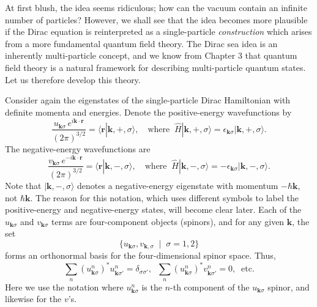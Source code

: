\documentclass[pra,12pt]{revtex4}
\begin{document}
At first blush, the idea seems ridiculous; how can the vacuum contain
an infinite number of particles?  However, we shall see that the idea
becomes more plausible if the Dirac equation is reinterpreted as a
single-particle \textit{construction} which arises from a more
fundamental quantum field theory.  The Dirac sea idea is an inherently
multi-particle concept, and we know from Chapter 3 that quantum field
theory is a natural framework for describing multi-particle quantum
states.  Let us therefore develop this theory.

Consider again the eigenstates of the single-particle Dirac
Hamiltonian with definite momenta and energies.  Denote the
positive-energy wavefunctions by
\begin{equation}
  \frac{u_{\mathbf{k}\sigma} \, e^{i\mathbf{k}\cdot \mathbf{r}}}{(2\pi)^{3/2}}
  = \langle \mathbf{r} | \mathbf{k}, +, \sigma\rangle,
  \quad\mathrm{where}\;\;
  \hat{H} |\mathbf{k}, +, \sigma\rangle
  = \epsilon_{\mathbf{k}\sigma} |\mathbf{k}, +, \sigma\rangle.
  \label{Diraces1}
\end{equation}
The negative-energy wavefunctions are
\begin{equation}
  \frac{v_{\mathbf{k}\sigma} \, e^{-i\mathbf{k}\cdot \mathbf{r}}}{(2\pi)^{3/2}}
  = \langle \mathbf{r} | \mathbf{k}, -, \sigma\rangle,
  \quad\mathrm{where}\;\;
  \hat{H} |\mathbf{k}, -, \sigma\rangle
  = - \epsilon_{\mathbf{k}\sigma} |\mathbf{k}, -, \sigma\rangle.
  \label{Diraces2}
\end{equation}
Note that $|\mathbf{k}, -, \sigma\rangle$ denotes a negative-energy
eigenstate with momentum $-\hbar\mathbf{k}$, not $\hbar\mathbf{k}$.
The reason for this notation, which uses different symbols to label
the positive-energy and negative-energy states, will become clear
later.  Each of the $u_{\mathbf{k}\sigma}$ and $v_{\mathbf{k}\sigma}$
terms are four-component objects (spinors), and for any given
$\mathbf{k}$, the set
\begin{equation*}
  \{ u_{\mathbf{k}\sigma}, v_{\mathbf{k},\sigma}\;\;  | \;\; \sigma = 1,2  \}
\end{equation*}
forms an orthonormal basis for the four-dimensional spinor space.
Thus,
\begin{equation}
  \sum_{n} \left(u^n_{\mathbf{k}\sigma}\right)^* u^n_{\mathbf{k}\sigma'} = \delta_{\sigma\sigma'}, \;\;
  \sum_{n} \left(u^n_{\mathbf{k}\sigma}\right)^* v^n_{\mathbf{k}\sigma'} = 0, \;\;
  \textrm{etc.}
  \label{uvorthog}
\end{equation}
Here we use the notation where $u^n_{\mathbf{k}\sigma}$ is the $n$-th
component of the $u_{\mathbf{k}\sigma}$ spinor, and likewise for the
$v$'s.
\end{document}

